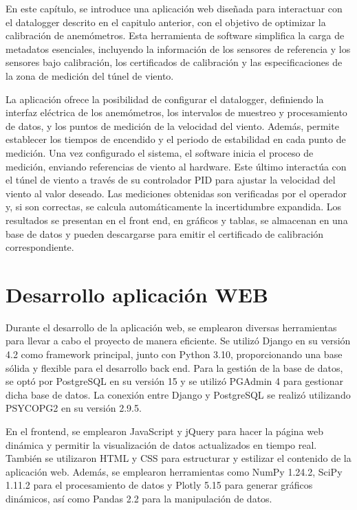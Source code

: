 En este capítulo, se introduce una aplicación web diseñada para interactuar con el datalogger descrito en el capitulo anterior, con el objetivo de optimizar la calibración de anemómetros. Esta herramienta de software simplifica la carga de metadatos esenciales, incluyendo la información de los sensores de referencia y los sensores bajo calibración, los certificados de calibración y las especificaciones de la zona de medición del túnel de viento.

La aplicación ofrece la posibilidad de configurar el datalogger, definiendo la interfaz eléctrica de los anemómetros, los intervalos de muestreo y procesamiento de datos, y los puntos de medición de la velocidad del viento. Además, permite establecer los tiempos de encendido y el periodo de estabilidad en cada punto de medición. Una vez configurado el sistema, el software inicia el proceso de medición, enviando referencias de viento al hardware. Este último interactúa con el túnel de viento a través de su controlador PID para ajustar la velocidad del viento al valor deseado. Las mediciones obtenidas son verificadas por el operador y, si son correctas, se calcula automáticamente la incertidumbre expandida. Los resultados se presentan en el front end, en gráficos y tablas, se almacenan en una base de datos y pueden descargarse para emitir el certificado de calibración correspondiente.


\section{Desarrollo aplicación WEB}
Durante el desarrollo de la aplicación web, se emplearon diversas herramientas para llevar a cabo el proyecto de manera eficiente. Se utilizó Django en su versión 4.2 como framework principal, junto con Python 3.10, proporcionando una base sólida y flexible para el desarrollo back end. Para la gestión de la base de datos, se optó por PostgreSQL en su versión 15 y se utilizó PGAdmin 4 para gestionar dicha base de datos. La conexión entre Django y PostgreSQL se realizó utilizando PSYCOPG2 en su versión 2.9.5.

En el frontend, se emplearon JavaScript y jQuery para hacer la página web dinámica y permitir la visualización de datos actualizados en tiempo real. También se utilizaron HTML y CSS para estructurar y estilizar el contenido de la aplicación web. Además, se emplearon herramientas como NumPy 1.24.2, SciPy  1.11.2 para el procesamiento de datos y Plotly 5.15 para generar gráficos dinámicos, así como Pandas 2.2 para la manipulación de datos.

